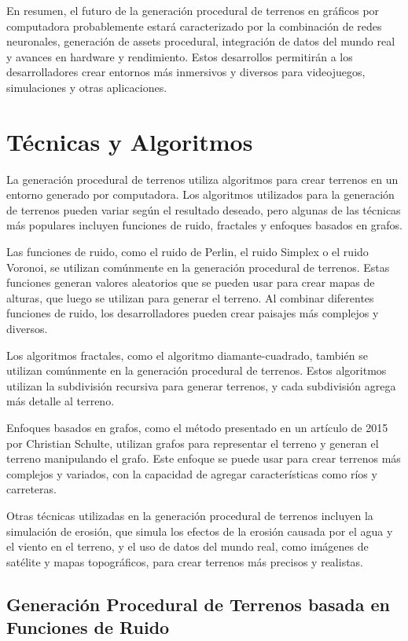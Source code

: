 En resumen, el futuro de la generación procedural de terrenos en gráficos por computadora probablemente estará caracterizado por la combinación de redes neuronales, generación de assets procedural, integración de datos del mundo real y avances en hardware y rendimiento. Estos desarrollos permitirán a los desarrolladores crear entornos más inmersivos y diversos para videojuegos, simulaciones y otras aplicaciones.

\section{Técnicas y Algoritmos}

La generación procedural de terrenos utiliza algoritmos para crear terrenos en un entorno generado por computadora. Los algoritmos utilizados para la generación de terrenos pueden variar según el resultado deseado, pero algunas de las técnicas más populares incluyen funciones de ruido, fractales y enfoques basados en grafos.

Las funciones de ruido, como el ruido de Perlin, el ruido Simplex o el ruido Voronoi, se utilizan comúnmente en la generación procedural de terrenos. Estas funciones generan valores aleatorios que se pueden usar para crear mapas de alturas, que luego se utilizan para generar el terreno. Al combinar diferentes funciones de ruido, los desarrolladores pueden crear paisajes más complejos y diversos.

Los algoritmos fractales, como el algoritmo diamante-cuadrado, también se utilizan comúnmente en la generación procedural de terrenos. Estos algoritmos utilizan la subdivisión recursiva para generar terrenos, y cada subdivisión agrega más detalle al terreno.

Enfoques basados en grafos, como el método presentado en un artículo de 2015 por Christian Schulte, utilizan grafos para representar el terreno y generan el terreno manipulando el grafo. Este enfoque se puede usar para crear terrenos más complejos y variados, con la capacidad de agregar características como ríos y carreteras.

Otras técnicas utilizadas en la generación procedural de terrenos incluyen la simulación de erosión, que simula los efectos de la erosión causada por el agua y el viento en el terreno, y el uso de datos del mundo real, como imágenes de satélite y mapas topográficos, para crear terrenos más precisos y realistas.

\subsection{Generación Procedural de Terrenos basada en Funciones de Ruido}

